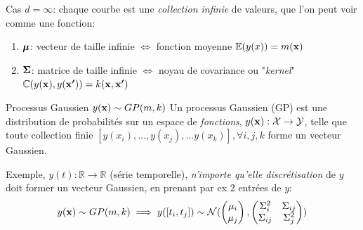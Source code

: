 \documentclass[xcolor=svgnames, t]{beamer}
\newcommand{\vectorx}[1]{\boldsymbol{\MakeLowercase{\mathbf{#1}}}}
\newcommand{\matrixx}[1]{\boldsymbol{\MakeUppercase{#1}}}
\newcommand{\coloredemph}[1]{\textcolor{internationalblue}{\emph{#1}}}
\begin{document}
\begin{frame}{\subsecname}
  
  Cas $d=\infty$: chaque courbe est une \coloredemph{collection infinie} de valeurs, que l'on peut voir comme une fonction:%
  \begin{enumerate}
    \item $\vectorx{\mu}$: vecteur de taille infinie $\Leftrightarrow$ fonction moyenne $\mathbb{E}(y(x)) = m(\vectorx{x})$
    \item $\matrixx{\Sigma}$: matrice de taille infinie $\Leftrightarrow$  noyau de covariance ou "\coloredemph{kernel}"
    $\mathbb{C}( y(\vectorx{x}), y(\vectorx{x^\prime}) ) = k(\vectorx{x}, \vectorx{x^{\prime}})$
  \end{enumerate}
  \pause
  \begin{block}{Processus Gaussien $y(\vectorx{x}) \sim GP(m, k)$}
    Un processus Gaussien (GP) est une distribution de probabilités sur un espace de \coloredemph{fonctions},
    $y(\vectorx{x}): \mathcal{X} \to \mathcal{Y}$, telle que toute collection finie
    $[ y(x_i), \dots, y(x_j), \dots y(x_k) ], \forall i,j,k$ forme un vecteur Gaussien. 
  \end{block}
  \pause
  Exemple, $y(t): \mathbb{R} \to \mathbb{R}$ (série temporelle), \coloredemph{n'importe qu'elle discrétisation} de $y$ doit
   former un vecteur Gaussien, en prenant par ex $2$ entrées de $y$:
  \begin{equation*}
    y(\vectorx{x}) \sim GP(m, k) \implies
    y([t_i, t_j]) \sim \mathcal{N} (
      \begin{pmatrix}
        \mu_i \\
        \mu_j 
      \end{pmatrix},
      \begin{pmatrix}
        \Sigma_{i}^2 & \Sigma_{ij} \\
        \Sigma_{ij} & \Sigma_{j}^2
      \end{pmatrix}
      )
  \end{equation*}
\end{frame}
\end{document}
